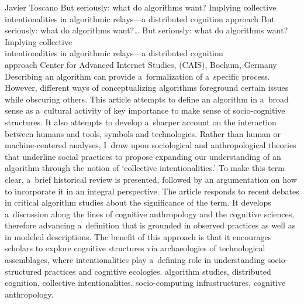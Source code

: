 \begin{artengenv}{Javier Toscano}
	{But seriously: what do algorithms want? Implying collective intentionalities in algorithmic relays---a distributed cognition approach}
	{But seriously: what do algorithms want?\ldots}
	{But seriously: what do algorithms want? Implying collective\\intentionalities in algorithmic relays---a distributed cognition\\approach}
	{Center for Advanced Internet Studies, (CAIS), Bochum, Germany}
	{Describing an algorithm can provide a~formalization of a~specific process. However, different ways of conceptualizing algorithms foreground certain issues while obscuring others. This article attempts to define an algorithm in a~broad sense as a~cultural activity of key importance to make sense of socio-cognitive structures. It also attempts to develop a~sharper account on the interaction between humans and tools, symbols and technologies. Rather than human or machine-centered analyses, I~draw upon sociological and anthropological theories that underline social practices to propose expanding our understanding of an algorithm through the notion of ‘collective intentionalities.' To make this term clear, a~brief historical review is presented, followed by an argumentation on how to incorporate it in an integral perspective. The article responds to recent debates in critical algorithm studies about the significance of the term. It develops a~discussion along the lines of cognitive anthropology and the cognitive sciences, therefore advancing a~definition that is grounded in observed practices as well as in modeled descriptions. The benefit of this approach is that it encourages scholars to explore cognitive structures via archaeologies of technological assemblages, where intentionalities play a~defining role in understanding socio-structured practices and cognitive ecologies.
	}
	{algorithm studies, distributed cognition, collective intentionalities, socio-computing infrastructures, cognitive anthropology.}
	

\end{artengenv}

